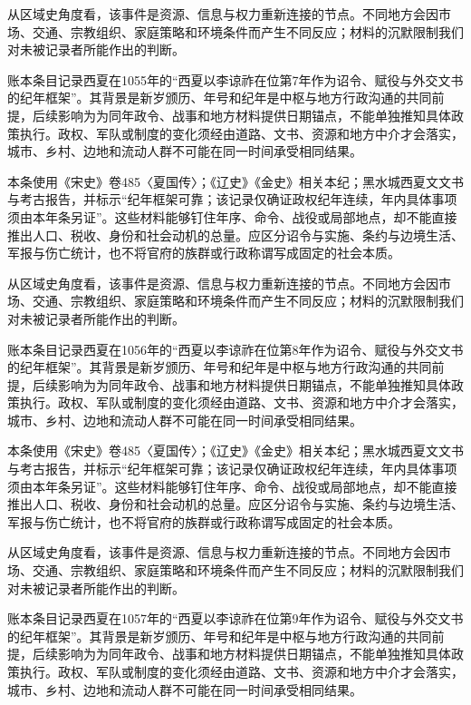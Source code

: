 从区域史角度看，该事件是资源、信息与权力重新连接的节点。不同地方会因市场、交通、宗教组织、家庭策略和环境条件而产生不同反应；材料的沉默限制我们对未被记录者所能作出的判断。

账本条目记录西夏在1055年的“西夏以李谅祚在位第7年作为诏令、赋役与外交文书的纪年框架”。其背景是新岁颁历、年号和纪年是中枢与地方行政沟通的共同前提，后续影响为为同年政令、战事和地方材料提供日期锚点，不能单独推知具体政策执行。政权、军队或制度的变化须经由道路、文书、资源和地方中介才会落实，城市、乡村、边地和流动人群不可能在同一时间承受相同结果。

本条使用《宋史》卷485〈夏国传〉；《辽史》《金史》相关本纪；黑水城西夏文文书与考古报告，并标示“纪年框架可靠；该记录仅确证政权纪年连续，年内具体事项须由本年条另证”。这些材料能够钉住年序、命令、战役或局部地点，却不能直接推出人口、税收、身份和社会动机的总量。应区分诏令与实施、条约与边境生活、军报与伤亡统计，也不将官府的族群或行政称谓写成固定的社会本质。

从区域史角度看，该事件是资源、信息与权力重新连接的节点。不同地方会因市场、交通、宗教组织、家庭策略和环境条件而产生不同反应；材料的沉默限制我们对未被记录者所能作出的判断。

账本条目记录西夏在1056年的“西夏以李谅祚在位第8年作为诏令、赋役与外交文书的纪年框架”。其背景是新岁颁历、年号和纪年是中枢与地方行政沟通的共同前提，后续影响为为同年政令、战事和地方材料提供日期锚点，不能单独推知具体政策执行。政权、军队或制度的变化须经由道路、文书、资源和地方中介才会落实，城市、乡村、边地和流动人群不可能在同一时间承受相同结果。

本条使用《宋史》卷485〈夏国传〉；《辽史》《金史》相关本纪；黑水城西夏文文书与考古报告，并标示“纪年框架可靠；该记录仅确证政权纪年连续，年内具体事项须由本年条另证”。这些材料能够钉住年序、命令、战役或局部地点，却不能直接推出人口、税收、身份和社会动机的总量。应区分诏令与实施、条约与边境生活、军报与伤亡统计，也不将官府的族群或行政称谓写成固定的社会本质。

从区域史角度看，该事件是资源、信息与权力重新连接的节点。不同地方会因市场、交通、宗教组织、家庭策略和环境条件而产生不同反应；材料的沉默限制我们对未被记录者所能作出的判断。

账本条目记录西夏在1057年的“西夏以李谅祚在位第9年作为诏令、赋役与外交文书的纪年框架”。其背景是新岁颁历、年号和纪年是中枢与地方行政沟通的共同前提，后续影响为为同年政令、战事和地方材料提供日期锚点，不能单独推知具体政策执行。政权、军队或制度的变化须经由道路、文书、资源和地方中介才会落实，城市、乡村、边地和流动人群不可能在同一时间承受相同结果。

